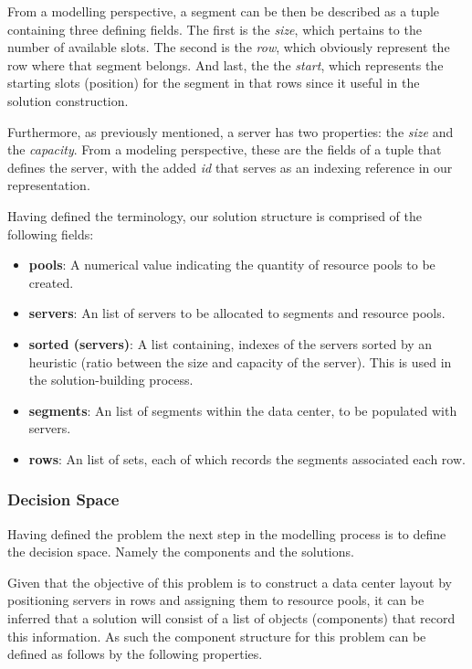 From a modelling perspective, a segment can be then be described as a tuple
containing three defining fields. The first is the \textit{size}, which pertains
to the number of available slots. The second is the \textit{row}, which
obviously represent the row where that segment belongs. And last, the the
\textit{start}, which represents the starting slots (position) for the segment
in that rows since it useful in the solution construction.

Furthermore, as previously mentioned, a server has two properties: the
\textit{size} and the \textit{capacity}. From a modeling perspective, these are
the fields of a tuple that defines the server, with the added \textit{id} that
serves as an indexing reference in our representation.

Having defined the terminology, our solution structure is comprised of the
following fields:

\begin{itemize} \item \textbf{pools}: A numerical value indicating the quantity
        of resource pools to be created. \item \textbf{servers}: An list of servers to
        be allocated to segments and resource pools. \item \textbf{sorted (servers)}: A
        list containing, indexes of the servers sorted by an heuristic (ratio between
        the size and capacity of the server). This is used in the solution-building
        process. \item \textbf{segments}: An list of segments within the data center, to
        be populated with servers. \item \textbf{rows}: An list of sets, each of which
        records the segments associated each row. \end{itemize}

\subsubsection{Decision Space} \label{section:data-center-decision-space}

Having defined the problem the next step in the modelling process is to define
the decision space. Namely the components and the solutions.

Given that the objective of this problem is to construct a data center layout
by positioning servers in rows and assigning them to resource pools, it can be
inferred that a solution will consist of a list of objects (components) that
record this information. As such the component structure for this problem can be
defined as follows by the following properties.

